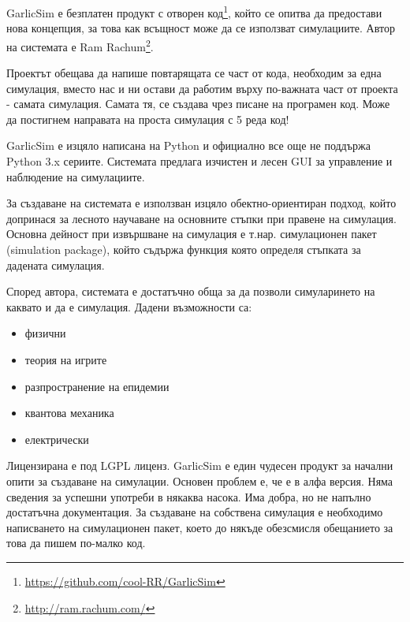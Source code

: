 			GarlicSim е безплатен продукт с отворен код\footnote{\url{https://github.com/cool-RR/GarlicSim}}, 
			който се опитва да предостави нова концепция, за това как всъщност може да се използват симулациите.
			Автор на системата е Ram Rachum\footnote{\url{http://ram.rachum.com/}}.			
			
			
				Проектът обещава да напише повтарящата се част от кода, необходим за една симулация, вместо нас и ни
				остави да работим върху по-важната част от проекта - самата симулация. Самата тя, се създава чрез 
				писане на програмен код. Може да постигнем направата на проста симулация с 5 реда код!   			
			
				
				GarlicSim е изцяло написана на Python и официално все още не поддържа Python 3.x сериите. 
				Системата предлага изчистен и лесен GUI за управление и наблюдение на симулациите. 			
			
			
				За създаване на системата е използван изцяло обектно-ориентиран подход, който допринася за лесното
				научаване на основните стъпки при правене на симулация. Основна дейност при извършване на симулация
				е т.нар. симулационен пакет (simulation package), който съдържа функция която определя стъпката за
				дадената симулация.
			
			
				Според автора, системата е достатъчно обща за да позволи симуларинето на каквато и да е симулация.
				Дадени възможности са:

				\begin{itemize}
					\item физични
					\item теория на игрите
					\item разпространение на епидемии
					\item квантова механика
					\item електрически
				\end{itemize}								
				
				Лицензирана е под \ac{LGPL} лиценз. GarlicSim е един чудесен продукт за начални опити за създаване на симулации. 
				Основен проблем е, че е в алфа версия. Няма сведения за успешни употреби в някаква насока.
				Има добра, но не напълно достатъчна документация. За създаване на собствена симулация е необходимо
				написването на симулационен пакет, което до някъде обезсмисля обещанието за това да пишем по-малко код.
				\cite{GarlicSim}